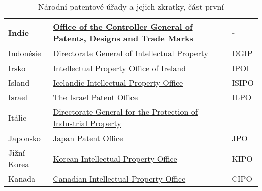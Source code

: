 \begin{table}[H]
\begin{tabular}{|>{\centering\arraybackslash}p{2.2cm}|>{\centering\arraybackslash}p{8cm}|>{\centering\arraybackslash}p{2cm}|}
	\hline
	Indie & \href{http://www.ipindia.nic.in/}{Office of the Controller General of Patents, Designs and Trade Marks}  & -         \\ 
	\hline
	Indonésie & \href{http://www.dgip.go.id/}{Directorate General of Intellectual Property}  & DGIP         \\ 
	\hline
	Irsko & \href{https://www.ipoi.gov.ie/en/}{Intellectual Property Office of Ireland}  & IPOI         \\ 
	\hline
	Island & \href{https://www.isipo.is/}{Icelandic Intellectual Property Office}  & ISIPO         \\ 
	\hline
	Israel & \href{https://www.gov.il/en/departments/ilpo}{The Israel Patent Office}  & ILPO         \\ 
	\hline
	Itálie & \href{https://uibm.mise.gov.it/index.php/it/}{Directorate General for the Protection of Industrial Property}  & -         \\ 
	\hline
	Japonsko & \href{https://www.jpo.go.jp/e/index.html}{Japan Patent Office}  & JPO         \\ 
	\hline
	Jižní Korea & \href{http://www.kipo.go.kr/}{Korean Intellectual Property Office}  & KIPO         \\ 
	\hline	
	Kanada & \href{https://www.ic.gc.ca/}{Canadian Intellectual Property Office}  & CIPO         \\ 
	\hline
	\end{tabular}
	\caption{Národní patentové úřady a jejich zkratky, část první}
	\label{tab:table_offices1}
	\end{table}

\newpage


